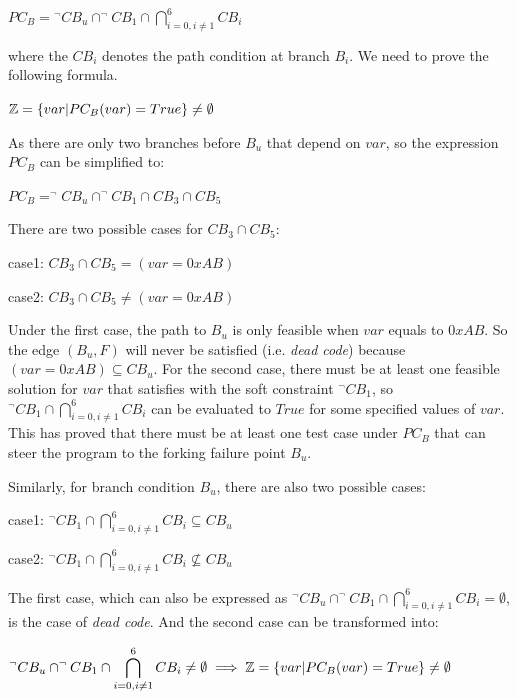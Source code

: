 \begin{center}
$PC_B = \displaystyle ^\neg CB_u \cap ^\neg CB_1 \cap \bigcap\limits_{i=0,i \neq 1}^{6} CB_i$
\end{center}
\noindent where the $CB_i$ denotes the path condition at branch $B_i$. We need to prove the following formula.

\begin{center}
$\mathbb{Z} = \{var\arrowvert PC_B(var) = True\} \neq \emptyset$
\end{center}

As there are only two branches before $B_u$ that depend on $var$, so the expression $PC_B$ can be simplified to:
\begin{center}
$PC_B = ^\neg CB_u \cap ^\neg CB_1 \cap CB_3 \cap CB_5$
\end{center}

There are two possible cases for $CB_3 \cap CB_5$:
\begin{center}
case1: $CB_3 \cap CB_5 = (var = 0xAB)$

case2: $CB_3 \cap CB_5 \neq (var = 0xAB)$
\end{center}

Under the first case, the path to $B_u$ is only feasible when $var$ equals to $0xAB$. So the edge $(B_u, F)$ will never be satisfied (i.e. \emph{dead code}) because $(var = 0xAB) \subseteq CB_u$. For the second case, there must be at least one feasible solution for $var$ that satisfies with the soft constraint $^\neg CB_1$, so $^\neg CB_1 \cap \bigcap_{i=0,i \neq 1}^{6} CB_i$ can be evaluated to $True$ for some specified values of $var$. This has proved that there must be at least one test case under $PC_B$ that can steer the program to the forking failure point $B_u$.

Similarly, for branch condition $B_u$, there are also two possible cases:
\begin{center}
case1: $\displaystyle ^\neg CB_1 \cap \bigcap\limits_{i=0,i\neq 1}^6 CB_i \subseteq CB_u$

case2: $\displaystyle ^\neg CB_1 \cap \bigcap\limits_{i=0,i\neq 1}^6 CB_i \nsubseteq CB_u$
\end{center}

The first case, which can also be expressed as $^\neg CB_u \cap ^\neg CB_1 \cap \bigcap_{i=0,i\neq 1}^6 CB_i = \emptyset$, is the case of \emph{dead code}. And the second case can be transformed into:
\begin{center}
$\displaystyle ^\neg CB_u \cap ^\neg CB_1 \cap \bigcap\limits_{i=0,i\neq 1}^6 CB_i \neq \emptyset \implies \mathbb{Z} = \{var\arrowvert PC_B(var) = True\} \neq \emptyset$
\end{center}

